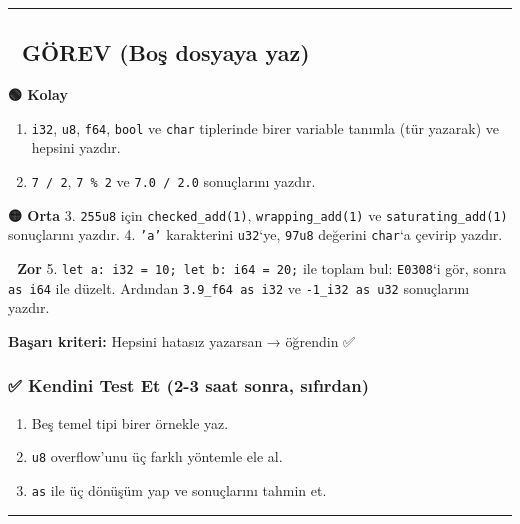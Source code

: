 \documentclass[12pt,a4paper]{article}
\begin{document}
\begin{center}\rule{0.5\linewidth}{0.5pt}\end{center}

\subsection{📝 GÖREV (Boş dosyaya yaz)}\label{görev-boş-dosyaya-yaz-2}

\textbf{🟢 Kolay}

\begin{enumerate}
\def\labelenumi{\arabic{enumi}.}
\tightlist
\item
  \texttt{i32}, \texttt{u8}, \texttt{f64}, \texttt{bool} ve \texttt{char} tiplerinde birer variable tanımla (tür yazarak) ve hepsini yazdır.
\item
  \texttt{7\ /\ 2}, \texttt{7\ \%\ 2} ve \texttt{7.0\ /\ 2.0} sonuçlarını yazdır.
\end{enumerate}

\textbf{🟡 Orta}
3. \texttt{255u8} için \texttt{checked\_add(1)}, \texttt{wrapping\_add(1)} ve \texttt{saturating\_add(1)} sonuçlarını yazdır.
4. \texttt{'a'} karakterini \texttt{u32}`ye, \texttt{97u8} değerini \texttt{char}`a çevirip yazdır.

\textbf{🔴 Zor}
5. \texttt{let\ a:\ i32\ =\ 10;\ let\ b:\ i64\ =\ 20;} ile toplam bul: \texttt{E0308}`i gör, sonra \texttt{as\ i64} ile düzelt. Ardından \texttt{3.9\_f64\ as\ i32} ve \texttt{-1\_i32\ as\ u32} sonuçlarını yazdır.

\textbf{Başarı kriteri:} Hepsini hatasız yazarsan → öğrendin ✅

\subsubsection{✅ Kendini Test Et (2-3 saat sonra, sıfırdan)}\label{kendini-test-et-2-3-saat-sonra-sıfırdan-3}

\begin{enumerate}
\def\labelenumi{\arabic{enumi}.}
\tightlist
\item
  Beş temel tipi birer örnekle yaz.
\item
  \texttt{u8} overflow'unu üç farklı yöntemle ele al.
\item
  \texttt{as} ile üç dönüşüm yap ve sonuçlarını tahmin et.
\end{enumerate}

\begin{center}\rule{0.5\linewidth}{0.5pt}\end{center}
\end{document}
